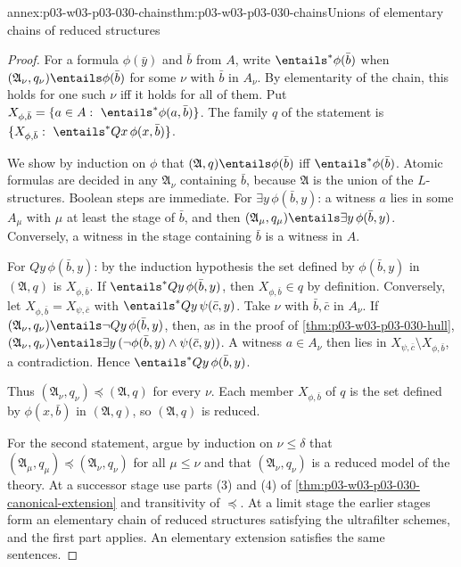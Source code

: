 \begin{annexitem}{annex:p03-w03-p03-030-chains}{thm:p03-w03-p03-030-chains}{Unions of elementary chains of reduced structures}
\begin{proof}
For a formula \(\phi(\bar y)\) and \(\bar b\) from \(A\), write
\(\entails^*\phi(\bar b)\) when \((\mathfrak A_\nu,q_\nu)\entails\phi(\bar
b)\) for some \(\nu\) with \(\bar b\) in \(A_\nu\).  By elementarity of the
chain, this holds for one such \(\nu\) iff it holds for all of them.  Put
\(X_{\phi,\bar b}=\{a\in A:\ \entails^*\phi(a,\bar b)\}\).  The family \(q\)
of the statement is \(\{X_{\phi,\bar b}:\ \entails^*Qx\,\phi(x,\bar b)\}\).

We show by induction on \(\phi\) that \((\mathfrak A,q)\entails\phi(\bar b)\)
iff \(\entails^*\phi(\bar b)\).  Atomic formulas are decided in any
\(\mathfrak A_\nu\) containing \(\bar b\), because \(\mathfrak A\) is the union
of the \(L\)-structures.  Boolean steps are immediate.  For \(\exists
y\,\phi(\bar b,y)\): a witness \(a\) lies in some \(A_\mu\) with \(\mu\) at
least the stage of \(\bar b\), and then \((\mathfrak A_\mu,q_\mu)\entails
\exists y\,\phi(\bar b,y)\).  Conversely, a witness in the stage containing
\(\bar b\) is a witness in \(A\).

For \(Qy\,\phi(\bar b,y)\): by the induction hypothesis the set defined by
\(\phi(\bar b,y)\) in \((\mathfrak A,q)\) is \(X_{\phi,\bar b}\).  If
\(\entails^*Qy\,\phi(\bar b,y)\), then \(X_{\phi,\bar b}\in q\) by
definition.  Conversely, let \(X_{\phi,\bar b}=X_{\psi,\bar c}\) with
\(\entails^*Qy\,\psi(\bar c,y)\).  Take \(\nu\) with \(\bar b,\bar c\) in
\(A_\nu\).  If \((\mathfrak A_\nu,q_\nu)\entails\neg Qy\,\phi(\bar b,y)\),
then, as in the proof of \cref{thm:p03-w03-p03-030-hull},
\((\mathfrak A_\nu,q_\nu)\entails\exists y\,(\neg\phi(\bar
b,y)\wedge\psi(\bar c,y))\).  A witness \(a\in A_\nu\) then lies in
\(X_{\psi,\bar c}\setminus X_{\phi,\bar b}\), a contradiction.  Hence
\(\entails^*Qy\,\phi(\bar b,y)\).

Thus \((\mathfrak A_\nu,q_\nu)\preccurlyeq(\mathfrak A,q)\) for every
\(\nu\).  Each member \(X_{\phi,\bar b}\) of \(q\) is the set defined by
\(\phi(x,\bar b)\) in \((\mathfrak A,q)\), so \((\mathfrak A,q)\) is reduced.

For the second statement, argue by induction on \(\nu\le\delta\) that
\((\mathfrak A_\mu,q_\mu)\preccurlyeq(\mathfrak A_\nu,q_\nu)\) for all
\(\mu\le\nu\) and that \((\mathfrak A_\nu,q_\nu)\) is a reduced model of the
theory.  At a successor stage use parts (3) and (4) of
\cref{thm:p03-w03-p03-030-canonical-extension} and transitivity of
\(\preccurlyeq\).  At a limit stage the earlier stages form an elementary
chain of reduced structures satisfying the ultrafilter schemes, and the
first part applies.  An elementary extension satisfies the same sentences.
\end{proof}
\end{annexitem}


